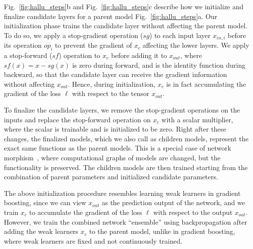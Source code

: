 \documentclass{article}
\begin{document}
Fig.~\ref{fig:hallu_steps}b and Fig.~\ref{fig:hallu_steps}c describe how we initialize and finalize candidate layers for a parent model Fig.~\ref{fig:hallu_steps}a. 
Our initialization phase trains the candidate layer without affecting the parent model. 
To do so, we apply a stop-gradient operation ($sg$) to each input layer $x_{in,i}$ before its operation $op_i$ to prevent the gradient of $x_c$ affecting the lower layers. 
We apply a stop-forward ($sf$) operation to $x_c$ before adding it to $x_{out}$, where $sf(x) = x - sg(x)$ is zero during forward, and is the identity function during backward, so that the candidate layer can receive the gradient information without affecting $x_{out}$. Hence, during initialization, $x_c$ is in fact accumulating the gradient of the loss $\ell$ with respect to the tensor $x_{out}$. 


To finalize the candidate layers, we remove the stop-gradient operations on the inputs and replace the stop-forward operation on $x_c$ with a scalar multiplier, where the scalar is trainable and is initialized to be zero. Right after these changes, the finalized models, which we also call as children models, represent the exact same functions as the parent models. This is a special case of network morphism~\citep{netmorph}, where computational graphs of models are changed, but the functionality is preserved. The children models are then trained starting from the combination of parent parameters and initialized candidate parameters. 

The above initialization procedure resembles learning weak learners in gradient boosting, since we can view $x_{out}$ as the prediction output of the network, and we train $x_c$ to accumulate the gradient of the loss $\ell$ with respect to the output $x_{out}$. However, we train the combined network ``ensemble'' using backpropagation after adding the weak learners $x_c$ to the parent model, unlike in gradient boosting, where weak learners are fixed and not continuously trained. 
\end{document}
